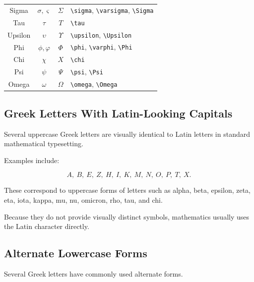 \begin{center}
\begin{tabular}{c|c|c|l}
Sigma
&
\(\sigma,\varsigma\)
&
\(\Sigma\)
&
\verb|\sigma|, \verb|\varsigma|, \verb|\Sigma|
\\

Tau
&
\(\tau\)
&
\(T\)
&
\verb|\tau|
\\

Upsilon
&
\(\upsilon\)
&
\(\Upsilon\)
&
\verb|\upsilon|, \verb|\Upsilon|
\\

Phi
&
\(\phi,\varphi\)
&
\(\Phi\)
&
\verb|\phi|, \verb|\varphi|, \verb|\Phi|
\\

Chi
&
\(\chi\)
&
\(X\)
&
\verb|\chi|
\\

Psi
&
\(\psi\)
&
\(\Psi\)
&
\verb|\psi|, \verb|\Psi|
\\

Omega
&
\(\omega\)
&
\(\Omega\)
&
\verb|\omega|, \verb|\Omega|
\end{tabular}
\end{center}

\subsection{Greek Letters With Latin-Looking Capitals}
\label{subsec:greek-latin-capitals}

Several uppercase Greek letters are visually identical to Latin letters in
standard mathematical typesetting.

Examples include:

\[
\boxed{
A,\ B,\ E,\ Z,\ H,\ I,\ K,\ M,\ N,\ O,\ P,\ T,\ X.
}
\]

These correspond to uppercase forms of letters such as alpha, beta, epsilon,
zeta, eta, iota, kappa, mu, nu, omicron, rho, tau, and chi.

Because they do not provide visually distinct symbols, mathematics usually
uses the Latin character directly.

\subsection{Alternate Lowercase Forms}
\label{subsec:alternate-greek-forms}

Several Greek letters have commonly used alternate forms.

